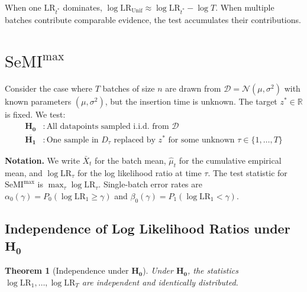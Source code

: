 \documentclass{article}
\theoremstyle{plain}
\newtheorem{theorem}{Theorem}[section]
\theoremstyle{definition}
\theoremstyle{remark}
\newcommand{\RR}{\ensuremath{\mathbb{R}}}
\newcommand{\cN}{\ensuremath{\mathcal{N}}}
\newcommand{\cD}{\ensuremath{\mathcal{D}}}
\renewcommand{\geq}{\geqslant}
\newcommand{\SeMImax}{\mathrm{SeMI}^{\max}}
\begin{document}
When one $\mathrm{LR}_{t^*}$ dominates, $\log \mathrm{LR}_{\mathrm{Unif}} \approx \log \mathrm{LR}_{t^*} - \log T$. When multiple batches contribute comparable evidence, the test accumulates their contributions.

\section{$\SeMImax$}
\label{app:unknown-tau-proofs}

Consider the case where $T$ batches of size $n$ are drawn from $\cD = \cN(\mu, \sigma^2)$ with known parameters $(\mu, \sigma^2)$, but the insertion time is unknown. The target $z^* \in \RR$ is fixed. We test:
\begin{align*}
    \mathbf{H_0} & : \text{All datapoints sampled i.i.d.\ from } \cD \\
    \overline{\mathbf{H_1}} & : \text{One sample in } D_\tau \text{ replaced by } z^* \text{ for some unknown } \tau \in \{1, \ldots, T\}
\end{align*}

\textbf{Notation.} We write $\bar{X}_t$ for the batch mean, $\hat{\mu}_t$ for the cumulative empirical mean, and $\log \mathrm{LR}_\tau$ for the log likelihood ratio at time $\tau$. The test statistic for $\SeMImax$ is $\max_{\tau} \log \mathrm{LR}_\tau$. Single-batch error rates are $\alpha_0(\gamma) = P_0(\log \mathrm{LR}_1 \geq \gamma)$ and $\beta_0(\gamma) = P_1(\log \mathrm{LR}_1 < \gamma)$.

\subsection{Independence of Log Likelihood Ratios under $\mathbf{H_0}$}
\label{app:proof-independence-h0}

\begin{theorem}[Independence under $\mathbf{H_0}$]
    \label{thm:independence-h0}
    Under $\mathbf{H_0}$, the statistics $\log \mathrm{LR}_1, \ldots, \log \mathrm{LR}_T$ are independent and identically distributed.
\end{theorem}
\end{document}
